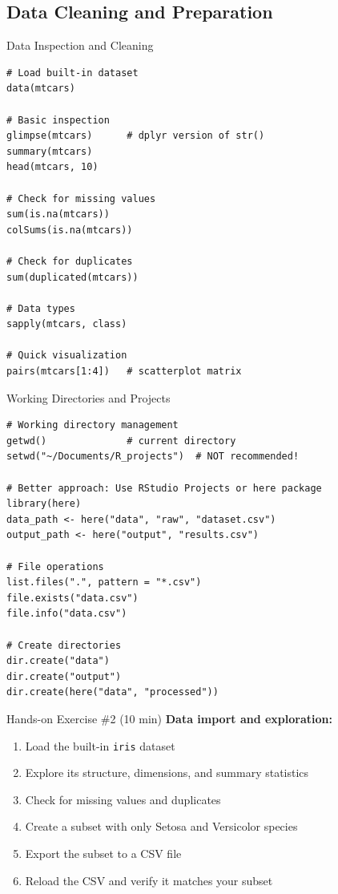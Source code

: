 \documentclass[aspectratio=169]{beamer}
\begin{document}
\subsection{Data Cleaning and Preparation}

\begin{frame}[fragile]{Data Inspection and Cleaning}
\begin{lstlisting}
# Load built-in dataset
data(mtcars)

# Basic inspection
glimpse(mtcars)      # dplyr version of str()
summary(mtcars)
head(mtcars, 10)

# Check for missing values
sum(is.na(mtcars))
colSums(is.na(mtcars))

# Check for duplicates
sum(duplicated(mtcars))

# Data types
sapply(mtcars, class)

# Quick visualization
pairs(mtcars[1:4])   # scatterplot matrix
\end{lstlisting}
\end{frame}

\begin{frame}[fragile]{Working Directories and Projects}
\begin{lstlisting}
# Working directory management
getwd()              # current directory
setwd("~/Documents/R_projects")  # NOT recommended!

# Better approach: Use RStudio Projects or here package
library(here)
data_path <- here("data", "raw", "dataset.csv")
output_path <- here("output", "results.csv")

# File operations
list.files(".", pattern = "*.csv")
file.exists("data.csv")
file.info("data.csv")

# Create directories
dir.create("data")
dir.create("output")
dir.create(here("data", "processed"))
\end{lstlisting}
\end{frame}

\begin{frame}{Hands-on Exercise \#2 (10 min)}
  \textbf{Data import and exploration:}
  \begin{enumerate}
    \item Load the built-in \texttt{iris} dataset
    \item Explore its structure, dimensions, and summary statistics
    \item Check for missing values and duplicates
    \item Create a subset with only Setosa and Versicolor species
    \item Export the subset to a CSV file
    \item Reload the CSV and verify it matches your subset
  \end{enumerate}
\end{frame}
\end{document}
